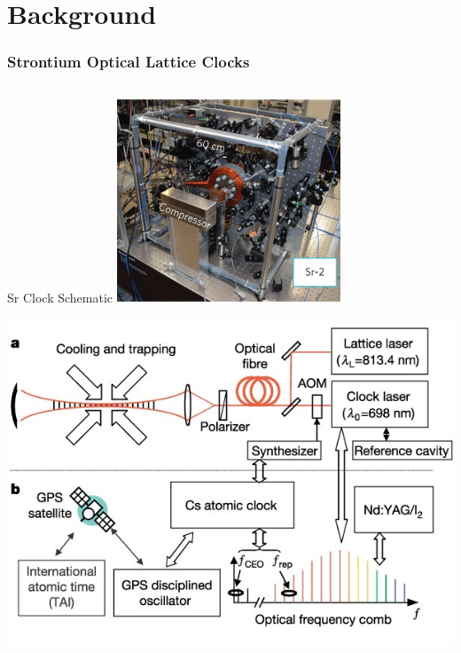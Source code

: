 \documentclass{beamer}
\begin{document}
\section{Background} 
\begin{frame}\frametitle{Strontium Optical Lattice Clocks}
    \begin{columns}
        \begin{block}{Sr Clock Schematic}
            \centering
            \includegraphics[width=0.5\textwidth,keepaspectratio]{Images/Sr_Clock_Img.jpg}

            \includegraphics[width=1.0\textwidth,keepaspectratio]{Images/Sr_Clock_Schem.jpg}
        \end{block}


\end{columns}
\end{frame}
\end{document}
